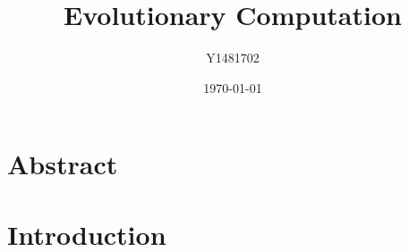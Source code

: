 \documentclass{article}
\title{Evolutionary Computation}
\author{Y1481702}
\date{\today}
\begin{document}

\begin{titlepage}
\maketitle
\tableofcontents
\end{titlepage}


\section{Abstract}

\section{Introduction}
\end{document}
